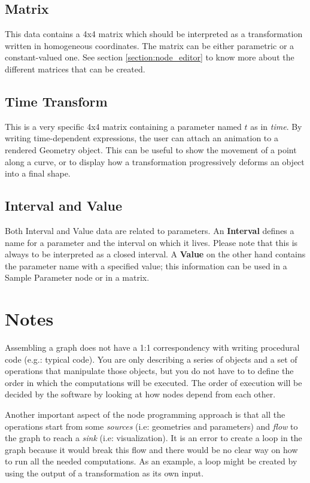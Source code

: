 \subsection{Matrix}
This data contains a 4x4 matrix which should be interpreted as a transformation written in
homogeneous coordinates. The matrix can be either parametric or a constant-valued one.
See section \ref{section:node_editor} to know more about the different matrices that can
be created.

\subsection{Time Transform}
This is a very specific 4x4 matrix containing a parameter named $t$ as in \textit{time}.
By writing time-dependent expressions, the user can attach an animation to 
a rendered Geometry object. This can be useful to show the movement of a
point along a curve, or to display how a transformation progressively deforms an object
into a final shape.

\subsection{Interval and Value}
Both {Interval} and {Value} data are related to parameters.
An \textbf{Interval} defines a name for a parameter and the interval on which it lives.
Please note that this is always to be interpreted as a closed interval.
A \textbf{Value} on the other hand contains the parameter name with a specified value;
this information can be used in a {Sample Parameter} node or in a matrix.

\section{Notes}
Assembling a graph does not have a 1:1 correspondency with writing procedural
code (e.g.: typical \CC{} code). You are only describing a series of
objects and a set of operations that manipulate those objects, but you do not have to
to define the order in which the computations will be executed. The order of execution
will be decided by the software by looking at how nodes depend from each other.

Another important aspect of the node programming approach is that all the operations
start from some \textit{sources} (i.e: geometries and parameters) and \textit{flow} to the graph
to reach a \textit{sink} (i.e: visualization). It is an error to create a loop in the graph because
it would break this flow and there would be no clear way on how to run all the
needed computations.
As an example, a loop might be created by using the output of a
transformation as its own input.

